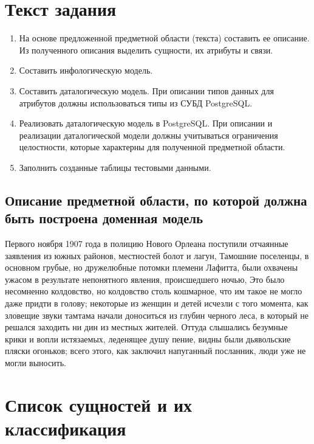 \documentclass{article}
\begin{document}
\itmo[
  variant=371364,
  labn=1,
  discipline=Информационные системы и базы данных,
  group=P3115,
  student=Владимир Мацюк,
  teacher=Горбунов Михаил Витальевич,
  year=2023
]

\section{Текст задания}
\begin{enumerate}
  \item На основе предложенной предметной области (текста) составить ее описание. Из полученного описания выделить сущности, их атрибуты и связи.
  \item Составить инфологическую модель.
  \item Составить даталогическую модель. При описании типов данных для атрибутов должны использоваться типы из СУБД PostgreSQL.
  \item Реализовать даталогическую модель в PostgreSQL. При описании и реализации даталогической модели должны учитываться ограничения целостности, которые характерны для полученной предметной области.
  \item Заполнить созданные таблицы тестовыми данными.
\end{enumerate}
\subsection{Описание предметной области, по которой должна быть построена доменная модель}

Первого ноября 1907 года в полицию Нового Орлеана поступили отчаянные заявления из южных районов, местностей болот и лагун, Тамошние поселенцы, в основном грубые, но дружелюбные потомки племени Лафитта, были охвачены ужасом в результате непонятного явления, происшедшего ночью, Это было несомненно колдовство, но колдовство столь кошмарное, что им такое не могло даже придти в голову; некоторые из женщин и детей исчезли с того момента, как зловещие звуки тамтама начали доноситься из глубин черного леса, в который не решался заходить ни дин из местных жителей. Оттуда слышались безумные крики и вопли истязаемых, леденящее душу пение, видны были дьявольские пляски огоньков; всего этого, как заключил напуганный посланник, люди уже не могли выносить.

\section{Список сущностей и их классификация}
\end{document}
